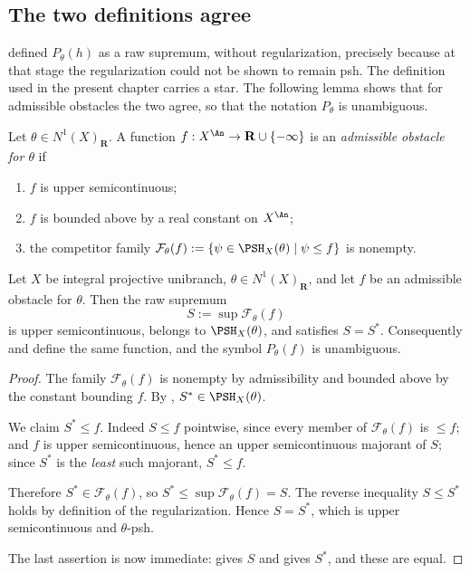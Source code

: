 \subsection{The two definitions agree}
\label{sec:ch45-two-definitions}

 defined $P_\theta(h)$ as a raw supremum,
without regularization, precisely because at that stage the regularization
could not be shown to remain psh.  The definition used in the present
chapter carries a star.  The following lemma shows that for admissible
obstacles the two agree, so that the notation $P_\theta$ is unambiguous.

\begin{definition}
\label{def:ch45-admissible-obstacle}
Let $\theta\in N^1(X)_{\mathbf R}$.  A function
$f:X^{\An}\to\mathbf R\cup\{-\infty\}$ is an \emph{admissible obstacle for
$\theta$} if
\begin{enumerate}
\item $f$ is upper semicontinuous;
\item $f$ is bounded above by a real constant on $X^{\An}$;
\item the competitor family
      $\mathcal F_\theta(f):=\{\psi\in\PSH_X(\theta)\mid\psi\le f\}$
      is nonempty.
\end{enumerate}
\end{definition}

\begin{lemma}
\label{lem:ch45-raw-equals-regularized}
Let $X$ be integral projective unibranch, $\theta\in N^1(X)_{\mathbf R}$,
and let $f$ be an admissible obstacle for $\theta$.  Then the raw
supremum
\[
 S:=\sup\mathcal F_\theta(f)
\]
is upper semicontinuous, belongs to $\PSH_X(\theta)$, and satisfies
$S=S^*$.  Consequently
 and
 define the same function, and the
symbol $P_\theta(f)$ is unambiguous.
\end{lemma}

\begin{proof}
The family $\mathcal F_\theta(f)$ is nonempty by admissibility and bounded above
by the constant bounding $f$.  By ,
$S^*\in\PSH_X(\theta)$.

We claim $S^*\le f$.  Indeed $S\le f$ pointwise, since every member of
$\mathcal F_\theta(f)$ is $\le f$; and $f$ is upper semicontinuous, hence an
upper semicontinuous majorant of $S$; since $S^*$ is the \emph{least}
such majorant, $S^*\le f$.

Therefore $S^*\in\mathcal F_\theta(f)$, so $S^*\le\sup\mathcal F_\theta(f)=S$.  The
reverse inequality $S\le S^*$ holds by definition of the regularization.
Hence $S=S^*$, which is upper semicontinuous and $\theta$-psh.

The last assertion is now immediate:  gives
$S$ and  gives $S^*$, and these are
equal.
\end{proof}

